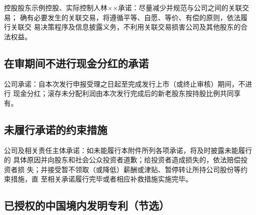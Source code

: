 控股股东示例控股、实际控制人林××承诺：尽量减少并规范与公司之间的关联交易；
确有必要发生的关联交易，将遵循平等、自愿、等价、有偿的原则，依法履行关联交
易决策程序及信息披露义务，不利用关联交易损害公司及其他股东的合法权益。

\subsection{在审期间不进行现金分红的承诺}

公司承诺：自本次发行申报受理之日起至完成发行上市（或终止审核）期间，不进行
现金分红；滚存未分配利润由本次发行完成后的新老股东按持股比例共同享有。

\subsection{未履行承诺的约束措施}

公司及相关责任主体承诺：如未能履行本附件所列各项承诺，将及时披露未能履行的
具体原因并向股东和社会公众投资者道歉；给投资者造成损失的，依法赔偿投资者损
失；并接受暂不领取（或降低）薪酬或津贴、暂停转让所持公司股份等约束措施，直
至相关承诺履行完毕或者相应补救措施实施完毕。



\subsection{已授权的中国境内发明专利（节选）}

